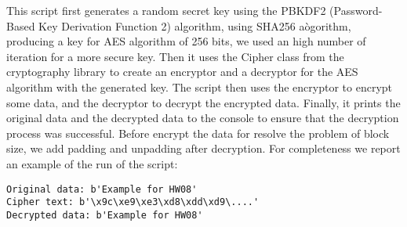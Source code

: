 \documentclass{article}
\begin{document}
This script first generates a random secret key using the PBKDF2 (Password-Based Key Derivation Function 2) algorithm, using SHA256 aògorithm, producing a key for AES algorithm of 256 bits, we used an high number of iteration for a more secure key. Then it uses the Cipher class from the cryptography library to create an encryptor and a decryptor for the AES algorithm with the generated key. The script then uses the encryptor to encrypt some data, and the decryptor to decrypt the encrypted data. Finally, it prints the original data and the decrypted data to the console to ensure that the decryption process was successful. Before encrypt the data for resolve the problem of block size, we add padding and unpadding after decryption. For completeness we report an example of the run of the script:
\begin{lstlisting}
Original data: b'Example for HW08'
Cipher text: b'\x9c\xe9\xe3\xd8\xdd\xd9\....'
Decrypted data: b'Example for HW08'
\end{lstlisting}
\end{document}
